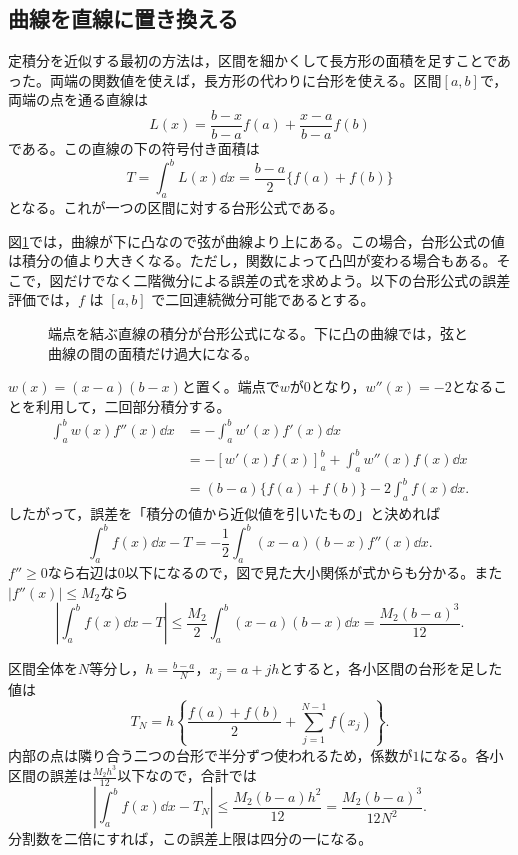 \subsection{曲線を直線に置き換える}

定積分を近似する最初の方法は，区間を細かくして長方形の面積を足すことであった。両端の関数値を使えば，長方形の代わりに台形を使える。区間$[a,b]$で，両端の点を通る直線は
\[
 L(x)=\frac{b-x}{b-a}f(a)+\frac{x-a}{b-a}f(b)
\]
である。この直線の下の符号付き面積は
\[
 T=\int_a^bL(x)\dd x=\frac{b-a}{2}\{f(a)+f(b)\}
\]
となる。これが一つの区間に対する台形公式である。

図\ref{図:台形近似}では，曲線が下に凸なので弦が曲線より上にある。この場合，台形公式の値は積分の値より大きくなる。ただし，関数によって凸凹が変わる場合もある。そこで，図だけでなく二階微分による誤差の式を求めよう。以下の台形公式の誤差評価では，$f$ は $[a,b]$ で二回連続微分可能であるとする。

\begin{figure}[htbp]
\centering
{}
\caption{端点を結ぶ直線の積分が台形公式になる。下に凸の曲線では，弦と曲線の間の面積だけ過大になる。}
\label{図:台形近似}
\end{figure}

$w(x)=(x-a)(b-x)$と置く。端点で$w$が$0$となり，$w''(x)=-2$となることを利用して，二回部分積分する。
\[
\begin{aligned}
 \int_a^b w(x)f''(x)\dd x
 &=-\int_a^bw'(x)f'(x)\dd x\\
 &=-[w'(x)f(x)]_a^b+\int_a^bw''(x)f(x)\dd x\\
 &=(b-a)\{f(a)+f(b)\}-2\int_a^bf(x)\dd x.
\end{aligned}
\]
したがって，誤差を「積分の値から近似値を引いたもの」と決めれば
\[
 \boxed{\int_a^bf(x)\dd x-T
 =-\frac12\int_a^b(x-a)(b-x)f''(x)\dd x}.
\]
$f''\geq0$なら右辺は$0$以下になるので，図で見た大小関係が式からも分かる。また$|f''(x)|\leq M_2$なら
\[
 \left|\int_a^bf(x)\dd x-T\right|
 \leq\frac{M_2}{2}\int_a^b(x-a)(b-x)\dd x
 =\frac{M_2(b-a)^3}{12}.
\]

区間全体を$N$等分し，$h=\frac{b-a}{N}$，$x_j=a+jh$とすると，各小区間の台形を足した値は
\[
 T_N=h\left\{\frac{f(a)+f(b)}2+\sum_{j=1}^{N-1}f(x_j)\right\}.
\]
内部の点は隣り合う二つの台形で半分ずつ使われるため，係数が$1$になる。各小区間の誤差は$\frac{M_2h^3}{12}$以下なので，合計では
\[
 \left|\int_a^bf(x)\dd x-T_N\right|
 \leq\frac{M_2(b-a)h^2}{12}
 =\frac{M_2(b-a)^3}{12N^2}.
\]
分割数を二倍にすれば，この誤差上限は四分の一になる。

